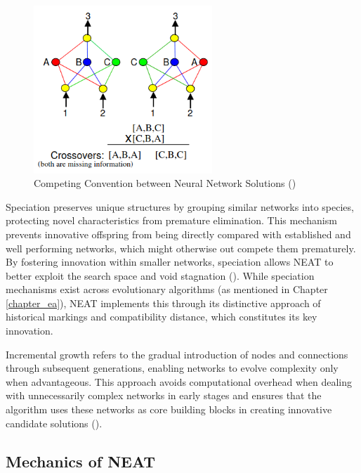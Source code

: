 \begin{figure}[H] %
	\centering %
	\includegraphics[width=0.6\textwidth]{Figures/chapter_ne/ne_competing_convention.png} %
	\caption{Competing Convention between Neural Network Solutions (\cite{stanley2002evolving})}
	\label{fig:competing_convension} %
\end{figure}

\noindent Speciation preserves unique structures by grouping similar networks into species, protecting novel characteristics from premature elimination. This mechanism prevents innovative offspring from being directly compared with established and well performing networks, which might otherwise out compete them prematurely. By fostering innovation within smaller networks, speciation allows NEAT to better exploit the search space and void stagnation (\cite{stanley2002evolving}). While speciation mechanisms exist across evolutionary algorithms (as mentioned in Chapter \ref{chapter_ea}), NEAT implements this through its distinctive approach of historical markings and compatibility distance, which constitutes its key innovation. \bigskip

\noindent Incremental growth refers to the gradual introduction of nodes and connections through subsequent generations, enabling networks to evolve complexity only when advantageous. This approach avoids computational overhead when dealing with unnecessarily complex networks in early stages and ensures that the algorithm uses these networks as core building blocks in creating innovative candidate solutions (\cite{stanley2002evolving}).

\subsection{Mechanics of NEAT}
